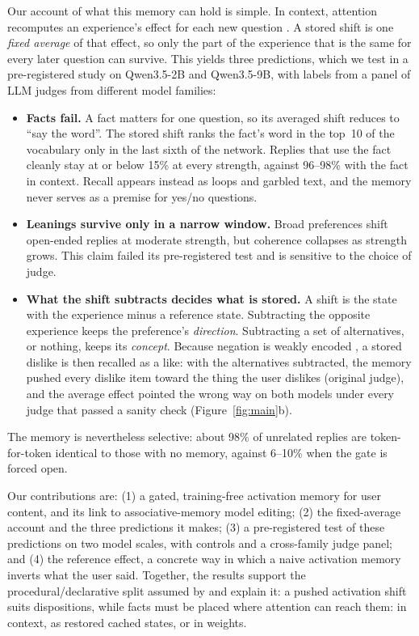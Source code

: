 \documentclass[11pt]{article}
\begin{document}
Our account of what this memory can hold is simple. In context, attention recomputes an experience's effect for each new question \citep{liu2024icv,geva2023dissecting}. A stored shift is one \emph{fixed average} of that effect, so only the part of the experience that is the same for every later question can survive. This yields three predictions, which we test in a pre-registered study on Qwen3.5-2B and Qwen3.5-9B, with labels from a panel of LLM judges from different model families:
\begin{itemize}
  \item \textbf{Facts fail.} A fact matters for one question, so its averaged shift reduces to ``say the word''. The stored shift ranks the fact's word in the top~10 of the vocabulary only in the last sixth of the network. Replies that use the fact cleanly stay at or below 15\% at every strength, against 96--98\% with the fact in context. Recall appears instead as loops and garbled text, and the memory never serves as a premise for yes/no questions.
  \item \textbf{Leanings survive only in a narrow window.} Broad preferences shift open-ended replies at moderate strength, but coherence collapses as strength grows. This claim failed its pre-registered test and is sensitive to the choice of judge.
  \item \textbf{What the shift subtracts decides what is stored.} A shift is the state with the experience minus a reference state. Subtracting the opposite experience keeps the preference's \emph{direction}. Subtracting a set of alternatives, or nothing, keeps its \emph{concept}. Because negation is weakly encoded \citep{jang2023negated}, a stored dislike is then recalled as a like: with the alternatives subtracted, the memory pushed every dislike item toward the thing the user dislikes (original judge), and the average effect pointed the wrong way on both models under every judge that passed a sanity check (Figure~\ref{fig:main}b).
\end{itemize}
The memory is nevertheless selective: about 98\% of unrelated replies are token-for-token identical to those with no memory, against 6--10\% when the gate is forced open.

Our contributions are: (1) a gated, training-free activation memory for user content, and its link to associative-memory model editing; (2) the fixed-average account and the three predictions it makes; (3) a pre-registered test of these predictions on two model scales, with controls and a cross-family judge panel; and (4) the reference effect, a concrete way in which a naive activation memory inverts what the user said. Together, the results support the procedural/declarative split assumed by \citet{zhao2026npm} and explain it: a pushed activation shift suits dispositions, while facts must be placed where attention can reach them: in context, as restored cached states, or in weights.
\end{document}
